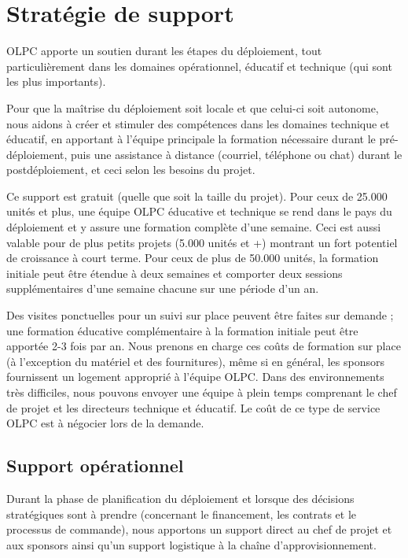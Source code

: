 \documentclass[12pt]{article}
\begin{document}
\section{Stratégie de support}
\label{sec-5}



OLPC apporte un soutien durant les étapes du déploiement, tout
particulièrement dans les domaines opérationnel, éducatif et technique (qui
sont les plus importants).

Pour que la maîtrise du déploiement soit locale et que celui-ci soit
autonome, nous aidons à créer et stimuler des compétences dans les domaines
technique et éducatif, en apportant à l'équipe principale la formation
nécessaire durant le pré-déploiement, puis une assistance à distance
(courriel, téléphone ou chat) durant le postdéploiement, et ceci selon les
besoins du projet.

Ce support est gratuit (quelle que soit la taille du projet). Pour ceux de
25.000 unités et plus, une équipe OLPC éducative et technique se rend dans
le pays du déploiement et y assure une formation complète d'une
semaine. Ceci est aussi valable pour de plus petits projets (5.000 unités
et +) montrant un fort potentiel de croissance à court terme. Pour ceux de
plus de 50.000 unités, la formation initiale peut être étendue à deux
semaines et comporter deux sessions supplémentaires d'une semaine chacune
sur une période d'un an.

Des visites ponctuelles pour un suivi sur place peuvent être faites sur
demande ; une formation éducative complémentaire à la formation initiale
peut être apportée 2-3 fois par an. Nous prenons en charge ces coûts de
formation sur place (à l'exception du matériel et des fournitures), même si
en général, les sponsors fournissent un logement approprié à l'équipe OLPC.
Dans des environnements très difficiles, nous pouvons envoyer une équipe à
plein temps comprenant le chef de projet et les directeurs technique et
éducatif. Le coût de ce type de service OLPC est à négocier lors de la
demande.
\subsection{Support opérationnel}
\label{sec-5-1}


Durant la phase de planification du déploiement et lorsque des décisions
stratégiques sont à prendre (concernant le financement, les contrats et le
processus de commande), nous apportons un support direct au chef de projet
et aux sponsors ainsi qu'un support logistique à la chaîne
d'approvisionnement.
\end{document}

